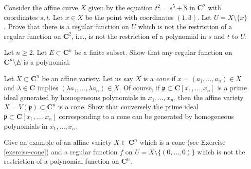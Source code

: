 \begin{exercise}
\label{exercise-extra-function}
Consider the affine curve $X$ given by the equation
$t^2 = s^5 + 8$ in $\mathbf{C}^2$ with coordinates $s, t$.
Let $x \in X$ be the point with coordinates $(1, 3)$.
Let $U = X \setminus \{x\}$. Prove that there is a
regular function on $U$ which is not the restriction
of a regular function on $\mathbf{C}^2$, i.e., is not
the restriction of a polynomial in $s$ and $t$ to $U$.
\end{exercise}

\begin{exercise}
\label{exercise-no-extra-function}
Let $n \geq 2$. Let $E \subset \mathbf{C}^n$ be a finite subset.
Show that any regular function on $\mathbf{C}^n \setminus E$
is a polynomial.
\end{exercise}

\begin{exercise}
\label{exercise-cone}
Let $X \subset \mathbf{C}^n$ be an affine variety. Let us say $X$ is a
{\it cone} if $x = (a_1, \ldots, a_n) \in X$ and $\lambda \in \mathbf{C}$
implies $(\lambda a_1, \ldots, \lambda a_n) \in X$.
Of course, if $\mathfrak p \subset \mathbf{C}[x_1, \ldots, x_n]$
is a prime ideal generated by homogeneous polynomials in $x_1, \ldots, x_n$,
then the affine variety $X = V(\mathfrak p) \subset \mathbf{C}^n$ is a cone.
Show that conversely the prime ideal
$\mathfrak p \subset \mathbf{C}[x_1, \ldots, x_n]$
corresponding to a cone can be generated by homogeneous polynomials
in $x_1, \ldots, x_n$.
\end{exercise}

\begin{exercise}
\label{exercise-extra-function-cone}
Give an example of an affine variety $X \subset \mathbf{C}^n$
which is a cone (see Exercise \ref{exercise-cone})
and a regular function $f$ on $U = X \setminus \{(0, \ldots, 0)\}$
which is not the restriction of a polynomial
function on $\mathbf{C}^n$.
\end{exercise}

